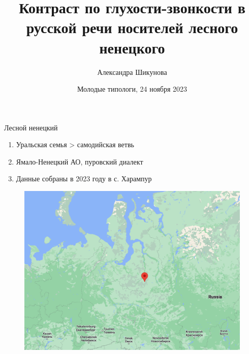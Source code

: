 \documentclass[10 pt, handout]{beamer}
\title{Контраст по глухости-звонкости в русской речи носителей лесного ненецкого}
\author{Александра Шикунова}
\institute{НИУ ВШЭ (Москва)}
\date{Молодые типологи, 24 ноября 2023}
\begin{document}
\begin{frame}
\titlepage
\end{frame}



\begin{frame}{Лесной ненецкий}

	\begin{enumerate}[$\gg$]
		\item Уральская семья > самодийская ветвь
		\item Ямало-Ненецкий АО, пуровский диалект
		\item Данные собраны в 2023 году в с. Харампур
	\end{enumerate}
	
	\begin{figure}[H]
		\includegraphics[width=.65\textwidth]{map}
	\end{figure}

\end{frame}
\end{document}
